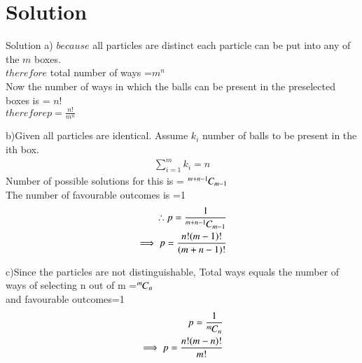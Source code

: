 \documentclass{beamer}
\newcommand*{\permcomb}[4][0mu]{{{}^{#3}\mkern#1#2_{#4}}}
\newcommand*{\comb}[1][-1mu]{\permcomb[#1]{C}}
\begin{document}
	\section{Solution}
	\begin{frame}{Solution}
	a) $because$ all particles are distinct each particle can be put into any of the $m$ boxes.\\
	 $therefore$ total number of ways =$m^n$\\
	 Now the number of ways in which the balls can be present in the preselected boxes is = $n!$\\
	 $therefore p= \frac{n!}{m^n}$
	 \end{frame}
	 \begin{frame}
	 b)Given all particles are identical. Assume $k_i$ number of balls to be present in the ith box.\\
	 \begin{align}
	 \sum_{i=1}^{m}k_{i}=n
	 \end{align}
	 Number of possible solutions for this is = $\comb{m+n-1}{m-1}$\\
	 The number of favourable outcomes is =1\\
	 \begin{align}
	  \therefore p=\frac{1}{\comb{m+n-1}{m-1}}\\
	  \implies p=\frac{n!(m-1)!}{(m+n-1)!}
	 \end{align}
	 \end{frame}
	 \begin{frame}
	c)Since the particles are not distinguishable, Total ways equals the number of ways of selecting n out of m =$\comb{m}{n}$\\
	and favourable outcomes=1\\
	\begin{align}
	p=\frac{1}{\comb{m}{n}}\\
	\implies p=\frac{n!(m-n)!}{m!}
	\end{align}
	\end{frame}
\end{document}
